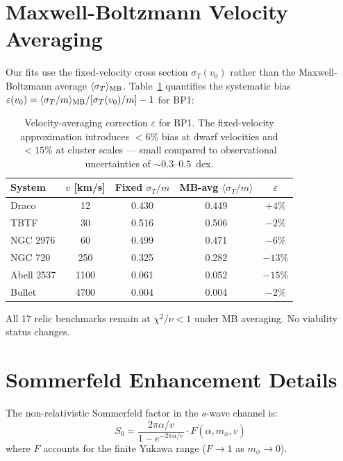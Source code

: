 \documentclass[12pt,a4paper]{article}
\newcommand{\sigmaT}{\sigma_T}
\begin{document}
\section{Maxwell-Boltzmann Velocity Averaging}
\label{app:mb_average}

Our fits use the fixed-velocity cross section $\sigmaT(v_0)$ rather than
the Maxwell-Boltzmann average $\langle\sigmaT\rangle_{\rm MB}$.
Table~\ref{tab:mb} quantifies the systematic bias
$\varepsilon(v_0) = \langle\sigmaT/m\rangle_{\rm MB}/[\sigmaT(v_0)/m] - 1$
for BP1:

\begin{table}[h!]
\centering
\caption{Velocity-averaging correction $\varepsilon$ for BP1.
         The fixed-velocity approximation introduces $< 6\%$ bias at dwarf
         velocities and $< 15\%$ at cluster scales — small compared to
         observational uncertainties of $\sim 0.3$--$0.5$~dex.}
\label{tab:mb}
\begin{tabular}{lcccc}
\toprule
System & $v$ [km/s] & Fixed $\sigmaT/m$ & MB-avg $\langle\sigmaT/m\rangle$ & $\varepsilon$ \\
\midrule
Draco      & 12   & 0.430 & 0.449 & $+4\%$ \\
TBTF       & 30   & 0.516 & 0.506 & $-2\%$ \\
NGC 2976   & 60   & 0.499 & 0.471 & $-6\%$ \\
NGC 720    & 250  & 0.325 & 0.282 & $-13\%$ \\
Abell 2537 & 1100 & 0.061 & 0.052 & $-15\%$ \\
Bullet     & 4700 & 0.004 & 0.004 & $-2\%$ \\
\bottomrule
\end{tabular}
\end{table}

All 17 relic benchmarks remain at $\chi^2/\nu < 1$ under MB averaging.
No viability status changes.

\section{Sommerfeld Enhancement Details}
\label{app:sommerfeld}

The non-relativistic Sommerfeld factor in the $s$-wave channel is:
\begin{equation}
  S_0 = \frac{2\pi\alpha/v}{1 - e^{-2\pi\alpha/v}} \cdot F(\alpha, m_\phi, v)
\end{equation}
where $F$ accounts for the finite Yukawa range ($F \to 1$ as $m_\phi \to 0$).
\end{document}
